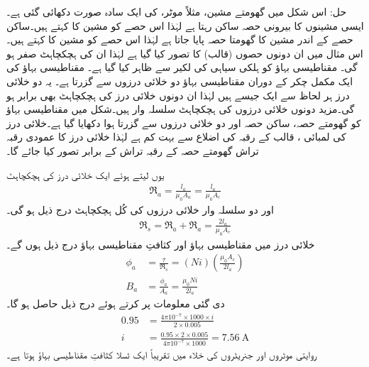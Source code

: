 حل:\quad
اس شکل میں گھومتے مشین، مثلاً موٹر، کی ایک سادہ صورت دکھائی گئی ہے۔ ایسی مشینوں کا بیرونی حصہ ساکن رہتا ہے لہٰذا اس حصے  کو مشین کا  کہتے ہیں۔ساکن حصے کے اندر مشین کا  گھومتا حصہ پایا جاتا ہے لہٰذا اس حصے کو مشین کا  کہتے ہیں۔ اس مثال میں ان دونوں  حصوں (قالب) کا    تصور کیا گیا ہے لہٰذا ان کی ہچکچاہٹ صفر ہو گی۔ مقناطیسی بہاؤ  کو ہلکی سیاہی کی لکیر سے ظاہر کیا گیا ہے۔ مقناطیسی بہاؤ کی ایک مکمل چکر کے دوران مقناطیسی بہاؤ دو خلائی درزوں  سے گزرتا ہے۔ یہ دو خلائی درز ہر لحاظ سے ایک   جیسے ہیں لہٰذا ان دونوں خلائی درز کی ہچکچاہٹ بھی برابر ہو گی۔مزید دونوں خلائی درزوں کی ہچکچاہٹ سلسلہ وار ہیں۔شکل  میں مقناطیسی بہاؤ کو گھومتے حصہ، ساکن حصہ اور دو خلائی درزوں  سے گزرتا ہوا دکھایا گیا ہے۔خلائی درز کی لمبائی ، قالب کے رقبہ  کی اضلاع سے بہت کم ہے لہٰذا خلائی درز کا عمودی رقبہ تراش   گھومتے حصہ کے رقبہ تراش  کے برابر تصور کیا جائے گا۔

یوں  لیتے ہوئے ایک خلائی درز کی ہچکچاہٹ
\begin{align*}
\Re_a=\frac{l_a}{\mu_0 A_a}=\frac{l_a}{\mu_0 A_c}
\end{align*}
اور دو سلسلہ وار خلائی درزوں کی کُل ہچکچاہٹ درج ذیل ہو گی۔
\begin{align*}
\Re_s=\Re_a+\Re_a=\frac{2 l_a}{\mu_0 A_c}
\end{align*}
خلائی درز میں مقناطیسی بہاؤ  اور کثافتِ مقناطیسی بہاؤ  درج ذیل ہوں گے۔
\begin{align*}
\phi_a&=\frac{\tau}{\Re_s}=\left(N i \right) \left (\frac{\mu_0 A_c}{2 l_a} \right)\\
B_a&=\frac{\phi_a}{A_a}=\frac{\mu_0 N i}{2 l_a}
\end{align*}
دی گئی معلومات پر کرتے ہوئے درج ذیل حاصل ہو گا۔
\begin{align*}
0.95&=\frac{4 \pi 10^{-7} \times 1000 \times i}{2 \times 0.005}\\
i&=\frac{0.95 \times 2 \times 0.005}{ 4 \pi 10^{-7} \times 1000}=\SI{7.56}{\ampere}
\end{align*}
روایتی موٹروں اور جنریٹروں کی خلاء میں تقریباً ایک ٹسلا کثافتِ مقناطیسی بہاؤ ہوتا ہے۔

